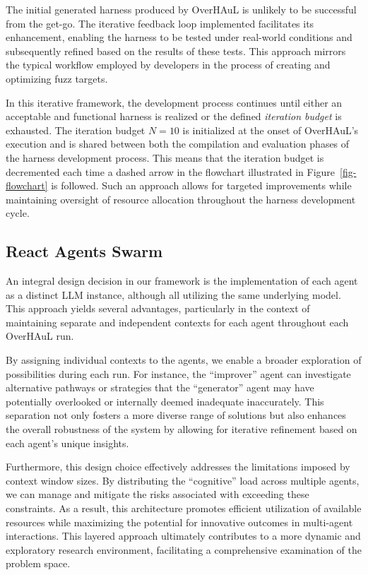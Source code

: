 \documentclass[
  a4paper,
]{scrreprt}
\theoremstyle{definition}
\theoremstyle{remark}
\begin{document}
The initial generated harness produced by OverHAuL is unlikely to be
successful from the get-go. The iterative feedback loop implemented
facilitates its enhancement, enabling the harness to be tested under
real-world conditions and subsequently refined based on the results of
these tests. This approach mirrors the typical workflow employed by
developers in the process of creating and optimizing fuzz targets.

In this iterative framework, the development process continues until
either an acceptable and functional harness is realized or the defined
\emph{iteration budget} is exhausted. The iteration budget \(N=10\) is
initialized at the onset of OverHAuL's execution and is shared between
both the compilation and evaluation phases of the harness development
process. This means that the iteration budget is decremented each time a
dashed arrow in the flowchart illustrated in Figure~\ref{fig-flowchart}
is followed. Such an approach allows for targeted improvements while
maintaining oversight of resource allocation throughout the harness
development cycle.

\subsection{React Agents Swarm}\label{react-agents-swarm}

An integral design decision in our framework is the implementation of
each agent as a distinct LLM instance, although all utilizing the same
underlying model. This approach yields several advantages, particularly
in the context of maintaining separate and independent contexts for each
agent throughout each OverHAuL run.

By assigning individual contexts to the agents, we enable a broader
exploration of possibilities during each run. For instance, the
``improver'' agent can investigate alternative pathways or strategies
that the ``generator'' agent may have potentially overlooked or
internally deemed inadequate inaccurately. This separation not only
fosters a more diverse range of solutions but also enhances the overall
robustness of the system by allowing for iterative refinement based on
each agent's unique insights.

Furthermore, this design choice effectively addresses the limitations
imposed by context window sizes. By distributing the ``cognitive'' load
across multiple agents, we can manage and mitigate the risks associated
with exceeding these constraints. As a result, this architecture
promotes efficient utilization of available resources while maximizing
the potential for innovative outcomes in multi-agent interactions. This
layered approach ultimately contributes to a more dynamic and
exploratory research environment, facilitating a comprehensive
examination of the problem space.
\end{document}
